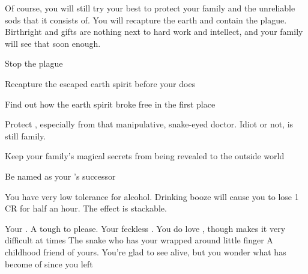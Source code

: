 \documentclass[char]{Pestilence}
\begin{document}
Of course, you will still try your best to protect your family and the unreliable sods that it consists of. You will recapture the earth and contain the plague. Birthright and gifts are nothing next to hard work and intellect, and your family will see that soon enough.

\begin{itemz}[Goals]
	\item Stop the plague
	\item Recapture the escaped earth spirit before your \cElder{\parent} does
	\item Find out how the earth spirit broke free in the first place
	\item Protect \cRebel{}, especially from that manipulative, snake-eyed doctor. Idiot or not, \cRebel{} is still family.
	\item Keep your family's magical secrets from being revealed to the outside world
	\item Be named as your \cElder{\parent}'s successor
\end{itemz}

\begin{itemz}[Notes]
	\item You have very low tolerance for alcohol. Drinking booze will cause you to lose 1 CR for half an hour. The effect is stackable.
\end{itemz}

\begin{contacts}
	\contact{\cElder{}} Your \cElder{\parent}. A tough \cElder{\human} to please.
	\contact{\cRebel{}} Your feckless \cRebel{\sibling}. You do love \cRebel{\them}, though \cRebel{\they} makes it very difficult at times
	\contact{\cOutsider{}} The snake who has your \cRebel{\sibling} wrapped around \cOutsider{\their} little finger 
	\contact{\cCon{}} A childhood friend of yours. You're glad to see \cCon{\them} alive, but you wonder what has become of \cCon{\them} since you left  
\end{contacts}
\end{document}
